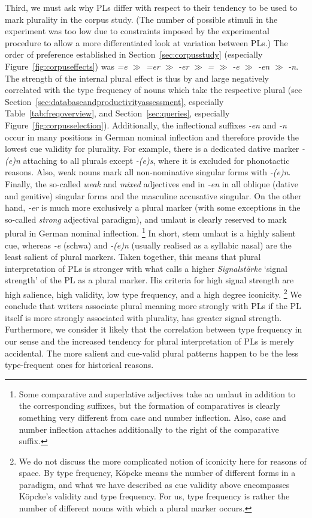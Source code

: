 Third, we must ask why PLs differ with respect to their tendency to be used to mark plurality in the corpus study.
(The number of possible stimuli in the experiment was too low due to constraints imposed by the experimental procedure to allow a more differentiated look at variation between PLs.)
The order of preference established in Section~\ref{sec:corpusstudy} (especially Figure~\ref{fig:corpuseffects}) was \textit{=e} $\gg$ \textit{=er} $\gg$ \textit{-er} $\gg$ \textit{=} $\gg$ \textit{-e} $\gg$ \textit{-en} $\gg$ \textit{-n}.
The strength of the internal plural effect is thus by and large negatively correlated with the type frequency of nouns which take the respective plural (see Section~\ref{sec:databaseandproductivityassessment}, especially Table~\ref{tab:freqoverview}, and Section~\ref{sec:queries}, especially Figure~\ref{fig:corpusselection}).
Additionally, the inflectional suffixes \textit{-en} and \textit{-n} occur in many positions in German nominal inflection and therefore provide the lowest cue validity for plurality.
For example, there is a dedicated dative marker \textit{-(e)n} attaching to all plurals except \textit{-(e)s}, where it is excluded for phonotactic reasons.
Also, weak nouns mark all non-nominative singular forms with \textit{-(e)n}.
Finally, the so-called \textit{weak} and \textit{mixed} adjectives end in \textit{-en} in all oblique (dative and genitive) singular forms and the masculine accusative singular.
On the other hand, \textit{-er} is much more exclusively a plural marker (with some exceptions in the so-called \textit{strong} adjectival paradigm), and umlaut is clearly reserved to mark plural in German nominal inflection.%
\footnote{Some comparative and superlative adjectives take an umlaut in addition to the corresponding suffixes, but the formation of comparatives is clearly something very different from case and number inflection.
Also, case and number inflection attaches additionally to the right of the comparative suffix.}
In short, stem umlaut is a highly salient cue, whereas \textit{-e} (schwa) and \textit{-(e)n} (usually realised as a syllabic nasal) are the least salient of plural markers.
Taken together, this means that plural interpretation of PLs is stronger with what \textcite{Koepcke1993} calls a higher \textit{Signalstärke} `signal strength' of the PL as a plural marker.
His criteria for high signal strength are high salience, high validity, low type frequency, and a high degree iconicity.%
\footnote{We do not discuss the more complicated notion of iconicity here for reasons of space.
By type frequency, Köpcke means the number of different forms in a paradigm, and what we have described as cue validity above encompasses Köpcke's validity and type frequency.
For us, type frequency is rather the number of different nouns with which a plural marker occurs.}
We conclude that writers associate plural meaning more strongly with PLs if the PL itself is more strongly associated with plurality, \ie has greater signal strength.
Furthermore, we consider it likely that the correlation between type frequency in our sense and the increased tendency for plural interpretation of PLs is merely accidental.
The more salient and cue-valid plural patterns happen to be the less type-frequent ones for historical reasons.

